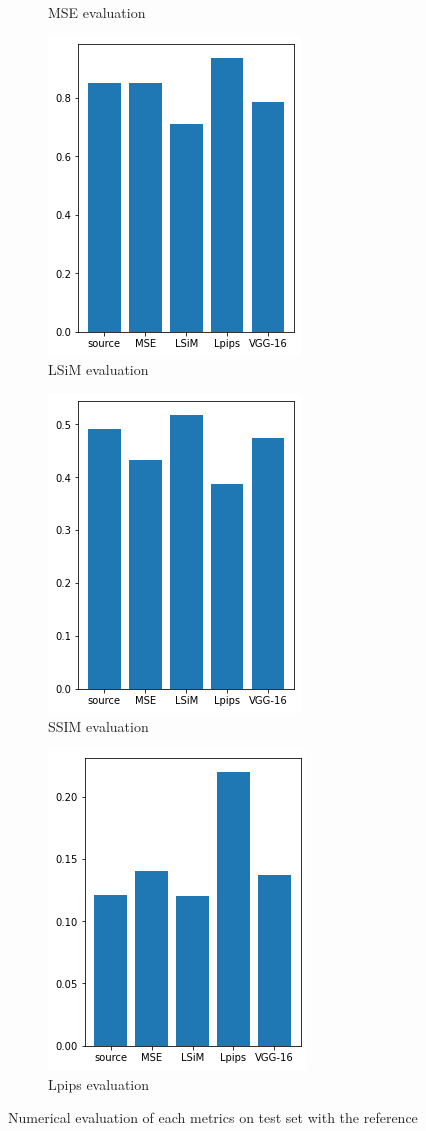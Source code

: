 \documentclass[a4paper,12pt,twoside]{report}
\begin{document}
\begin{figure}
\begin{subfigure}{0.32\textwidth}
		\caption{MSE evaluation}
	\end{subfigure}
	\begin{subfigure}{0.32\textwidth}
		\centering
		\includegraphics[scale=0.49]{karmanflow/lsim.png}
		\caption{LSiM evaluation}
	\end{subfigure}
	\begin{subfigure}{0.32\textwidth}
		\centering
		\includegraphics[scale=0.49]{karmanflow/ssim.png}
		\caption{SSIM evaluation}
	\end{subfigure}
	\begin{subfigure}{0.32\textwidth}
		\centering
		\includegraphics[scale=0.49]{karmanflow/lpips.png}
		\caption{Lpips evaluation}
	\end{subfigure}
	\caption{Numerical evaluation of each metrics on test set with the reference}
\end{figure}
\end{document}
